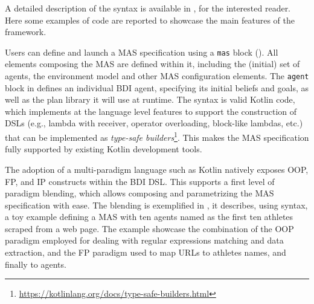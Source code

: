 A detailed description of the \jakta{} syntax is available in \cite{DBLP:journals/sncs/BaiardiBCP24}, for the interested reader.
%
Here some examples of \jakta{} code are reported to showcase the main features of the framework.

\noindent
\begin{minipage}{\linewidth}

\end{minipage}
%
Users can define and launch a \jakta{} \ac{MAS} specification using a \texttt{mas} block ().
All elements composing the \ac{MAS} are defined within it, including the (initial) set of agents, the environment model and other \ac{MAS} configuration elements.
%
The \texttt{agent} block in  defines an individual \ac{BDI} agent,
specifying its initial beliefs and goals, as well as the plan library it will use at runtime.
%
The syntax is valid Kotlin code, which implements at the language level features to support the construction of \acp{DSL} (e.g., lambda with receiver, operator overloading, block-like lambdas, etc.) that can be implemented as \emph{type-safe builders}\footnote{\url{https://kotlinlang.org/docs/type-safe-builders.html}}.
%
This makes the \ac{MAS} specification fully supported by existing Kotlin development tools.

\noindent
\begin{minipage}{\linewidth}

\end{minipage}
%
The adoption of a multi-paradigm language such as Kotlin
natively exposes \ac{OOP}, \ac{FP}, and \ac{IP} constructs within the \ac{BDI} \ac{DSL}.
This supports a first level of paradigm blending, which allows composing and parametrizing the \ac{MAS} specification with ease.
%
The blending is exemplified in ,
it describes, using \jakta{} syntax,
a toy example defining a \ac{MAS} with ten agents named as the first ten athletes scraped from a web page.
%
The example showcase the combination of the \ac{OOP} paradigm employed for dealing with regular expressions matching and data extraction,
and the \ac{FP} paradigm used to map URLs to athletes names, and finally to \jakta{} agents.

